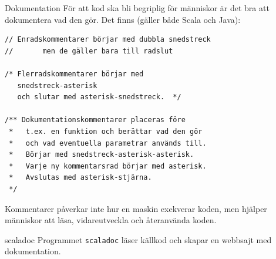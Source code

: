 \begin{Slide}{Dokumentation}\footnotesize
För att kod ska bli begriplig för människor är det bra att dokumentera vad den gör. Det finns  (gäller både Scala och Java):
\begin{lstlisting}
// Enradskommentarer börjar med dubbla snedstreck
//       men de gäller bara till radslut

/* Flerradskommentarer börjar med
   snedstreck-asterisk
   och slutar med asterisk-snedstreck.  */

/** Dokumentationskommentarer placeras före
 *   t.ex. en funktion och berättar vad den gör
 *   och vad eventuella parametrar används till.
 *   Börjar med snedstreck-asterisk-asterisk.
 *   Varje ny kommentarsrad börjar med asterisk.
 *   Avslutas med asterisk-stjärna.
 */
\end{lstlisting}
Kommentarer påverkar inte hur en maskin exekverar koden, men hjälper människor att läsa, vidareutveckla och återanvända koden.
\end{Slide}

\begin{Slide}{scaladoc}
Programmet \texttt{scaladoc} läser källkod och skapar en webbsajt med dokumentation.

\vspace{2em}
\end{Slide}


\ifkompendium\else

